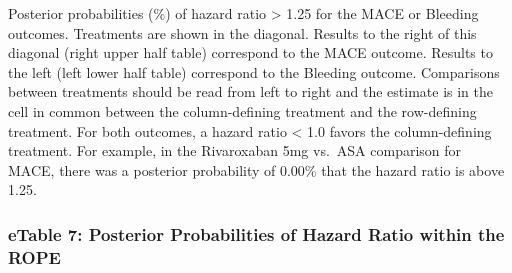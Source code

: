 \documentclass[
  12pt,
]{article}
\begin{document}
\begin{landscape}
\begin{table}[!h]
\centering
{}
\end{table}

Posterior probabilities (\%) of hazard ratio \textgreater{} 1.25 for the
MACE or Bleeding outcomes. Treatments are shown in the diagonal. Results
to the right of this diagonal (right upper half table) correspond to the
MACE outcome. Results to the left (left lower half table) correspond to
the Bleeding outcome. Comparisons between treatments should be read from
left to right and the estimate is in the cell in common between the
column-defining treatment and the row-defining treatment. For both
outcomes, a hazard ratio \textless{} 1.0 favors the column-defining
treatment. For example, in the Rivaroxaban 5mg vs.~ASA comparison for
MACE, there was a posterior probability of 0.00\% that the hazard ratio
is above 1.25.

\newpage

\hypertarget{etable-7-posterior-probabilities-of-hazard-ratio-within-the-rope}{%
\subsubsection{eTable 7: Posterior Probabilities of Hazard Ratio within
the
ROPE}\label{etable-7-posterior-probabilities-of-hazard-ratio-within-the-rope}}


\end{landscape}
\end{document}
